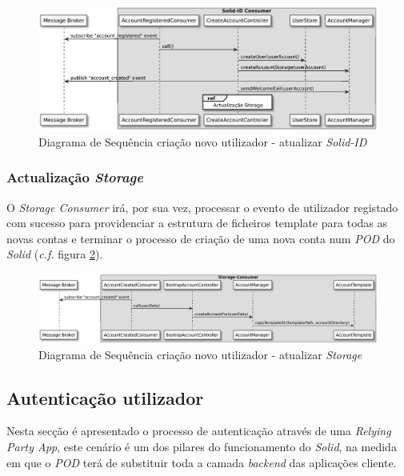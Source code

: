 \begin{figure}[H]
    \begin{center}
    \includegraphics[width=1 \textwidth]{figures/create_account_sd_diagram_2.eps}
    \caption{Diagrama de Sequência criação novo utilizador - atualizar \emph{Solid-ID}}
    \label{registo_conta_sd2}
    \end{center}
\end{figure}

\subsubsection{Actualização \emph{Storage}}

O \emph{Storage Consumer} irá, por sua vez, processar o evento de utilizador registado com sucesso para providenciar a estrutura de ficheiros template para todas as novas contas e terminar o processo de criação de uma nova conta num \emph{\acrshort{POD}} do \emph{Solid} (\emph{c.f.} figura \ref{registo_conta_sd3}).

\begin{figure}[H]
    \begin{center}
    \includegraphics[width=1 \textwidth]{figures/create_account_sd_diagram_3.eps}
    \caption{Diagrama de Sequência criação novo utilizador - atualizar \emph{Storage}}
        \label{registo_conta_sd3}
    \end{center}
\end{figure}

\subsection{Autenticação utilizador \label{design_authentication}}
Nesta secção é apresentado o processo de autenticação através de uma \emph{Relying Party App}, este cenário é um dos pilares do funcionamento do \emph{Solid}, na medida em que o \emph{\acrshort{POD}} terá de substituir toda a camada \emph{backend} das aplicações cliente.


